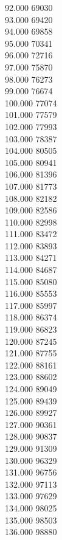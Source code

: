 { 92.000	69030 \\
 93.000	69420 \\
 94.000	69858 \\
 95.000	70341 \\
 96.000	72716 \\
 97.000	75870 \\
 98.000	76273 \\
 99.000	76674 \\
 100.000	77074 \\
 101.000	77579 \\
 102.000	77993 \\
 103.000	78387 \\
 104.000	80505 \\
 105.000	80941 \\
 106.000	81396 \\
 107.000	81773 \\
 108.000	82182 \\
 109.000	82586 \\
 110.000	82998 \\
 111.000	83472 \\
 112.000	83893 \\
 113.000	84271 \\
 114.000	84687 \\
 115.000	85080 \\
 116.000	85553 \\
 117.000	85997 \\
 118.000	86374 \\
 119.000	86823 \\
 120.000	87245 \\
 121.000	87755 \\
 122.000	88161 \\
 123.000	88602 \\
 124.000	89049 \\
 125.000	89439 \\
 126.000	89927 \\
 127.000	90361 \\
 128.000	90837 \\
 129.000	91309 \\
 130.000	96329 \\
 131.000	96756 \\
 132.000	97113 \\
 133.000	97629 \\
 134.000	98025 \\
 135.000	98503 \\
 136.000	98880 \\
}
